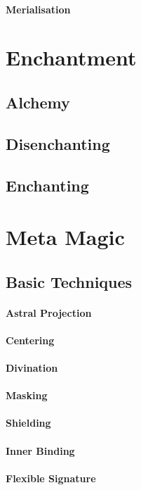 \paragraph{Merialisation}

\section{Enchantment}
\subsection{Alchemy}
\subsection{Disenchanting}
\subsection{Enchanting}

\section{Meta Magic}

\subsection{Basic Techniques}
\paragraph{Astral Projection}
\paragraph{Centering}
\paragraph{Divination}
\paragraph{Masking}
\paragraph{Shielding}
\paragraph{Inner Binding}
\paragraph{Flexible Signature}
